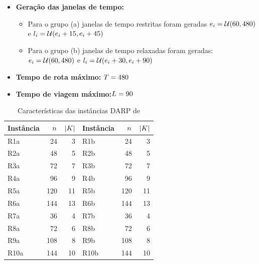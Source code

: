 \documentclass{anpet}
\begin{document}
\begin{itemize}
\begin{itemize}
    \end{itemize}
    \item \textbf{Geração das janelas de tempo:}     \begin{itemize}
        \item Para o grupo (a) janelas de tempo restritas foram geradas $e_i{} = \mathcal{U}(60,480)$ e $l_i{} = \mathcal{U}(e_i{} + 15, e_i{} + 45)$
        \item Para o grupo (b) janelas de tempo relaxadas foram geradas: $e_i{} = \mathcal{U}(60,480)$ e $l_i{} = \mathcal{U}(e_i{} + 30,e_i{} + 90)$
    \end{itemize}
    
    \item \textbf{Tempo de rota máximo:} $T = 480$
    \item \textbf{Tempo de viagem máximo:}$L = 90$
\end{itemize}

\begin{table}[H]
    \centering
    \caption{Características das instâncias DARP de \textcite{cordeau_tabu_2003}}
    \label{tab:cordeau_tabu_2003_DARP_intances_characteristics}
    \begin{tabular}{lrr|lrr}
        \toprule  
        Instância & $n$ & $|K|$ & Instância & $n$ & $|K|$\\
        \midrule
        R1a  &  24 &  3 & R1b  &  24 &  3\\
        R2a  &  48 &  5 & R2b  &  48 &  5\\
        R3a  &  72 &  7 & R3b  &  72 &  7\\
        R4a  &  96 &  9 & R4b  &  96 &  9\\
        R5a  & 120 & 11 & R5b  & 120 & 11\\
        R6a  & 144 & 13 & R6b  & 144 & 13\\
        R7a  &  36 &  4 & R7b  &  36 &  4\\
        R8a  &  72 &  6 & R8b  &  72 &  6\\
        R9a  & 108 &  8 & R9b  & 108 &  8\\
        R10a & 144 & 10 & R10b & 144 & 10\\
        \bottomrule
    \end{tabular}
\end{table}
\end{document}
